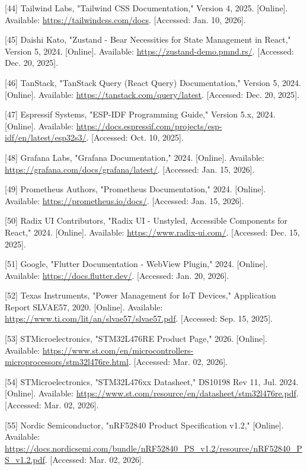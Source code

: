 \documentclass[a4paper]{extarticle}
\begin{document}
{[}44{]} Tailwind Labs, "Tailwind CSS Documentation," Version 4, 2025.
{[}Online{]}. Available: \url{https://tailwindcss.com/docs}.
{[}Accessed: Jan. 10, 2026{]}.

{[}45{]} Daishi Kato, "Zustand - Bear Necessities for State Management
in React," Version 5, 2024. {[}Online{]}. Available:
\url{https://zustand-demo.pmnd.rs/}. {[}Accessed: Dec. 20, 2025{]}.

{[}46{]} TanStack, "TanStack Query (React Query) Documentation," Version
5, 2024. {[}Online{]}. Available:
\url{https://tanstack.com/query/latest}. {[}Accessed: Dec. 20, 2025{]}.

{[}47{]} Espressif Systems, "ESP-IDF Programming Guide," Version 5.x,
2024. {[}Online{]}. Available:
\url{https://docs.espressif.com/projects/esp-idf/en/latest/esp32s3/}.
{[}Accessed: Oct. 10, 2025{]}.

{[}48{]} Grafana Labs, "Grafana Documentation," 2024. {[}Online{]}.
Available: \url{https://grafana.com/docs/grafana/latest/}. {[}Accessed:
Jan. 15, 2026{]}.

{[}49{]} Prometheus Authors, "Prometheus Documentation," 2024.
{[}Online{]}. Available: \url{https://prometheus.io/docs/}. {[}Accessed:
Jan. 15, 2026{]}.

{[}50{]} Radix UI Contributors, "Radix UI - Unstyled, Accessible
Components for React," 2024. {[}Online{]}. Available:
\url{https://www.radix-ui.com/}. {[}Accessed: Dec. 15, 2025{]}.

{[}51{]} Google, "Flutter Documentation - WebView Plugin," 2024.
{[}Online{]}. Available: \url{https://docs.flutter.dev/}. {[}Accessed:
Jan. 20, 2026{]}.

{[}52{]} Texas Instruments, "Power Management for IoT Devices,"
Application Report SLVAE57, 2020. {[}Online{]}. Available:
\url{https://www.ti.com/lit/an/slvae57/slvae57.pdf}. {[}Accessed: Sep.
15, 2025{]}.

{[}53{]} STMicroelectronics, "STM32L476RE Product Page," 2026.
{[}Online{]}. Available:
\url{https://www.st.com/en/microcontrollers-microprocessors/stm32l476re.html}.
{[}Accessed: Mar. 02, 2026{]}.

{[}54{]} STMicroelectronics, "STM32L476xx Datasheet," DS10198 Rev 11,
Jul. 2024. {[}Online{]}. Available:
\url{https://www.st.com/resource/en/datasheet/stm32l476re.pdf}.
{[}Accessed: Mar. 02, 2026{]}.

{[}55{]} Nordic Semiconductor, "nRF52840 Product Specification v1.2,"
{[}Online{]}. Available:
\url{https://docs.nordicsemi.com/bundle/nRF52840_PS_v1.2/resource/nRF52840_PS_v1.2.pdf}.
{[}Accessed: Mar. 02, 2026{]}.
\end{document}
